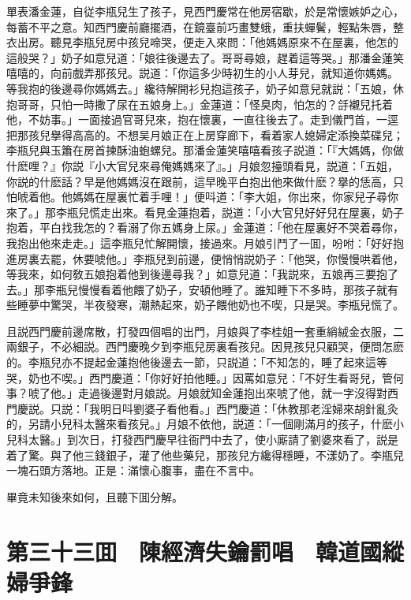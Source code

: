單表潘金蓮，自従李瓶兒生了孩子，見西門慶常在他房宿歇，於是常懷嫉妒之心，每蓄不平之意。知西門慶前廳擺酒，在鏡臺前巧畫雙蛾，重扶蟬鬢，輕點朱唇，整衣出房。聽見李瓶兒房中孩兒啼哭，便走入來問：「他媽媽原來不在屋裏，他怎的這般哭？」奶子如意兒道：「娘往後邊去了。哥哥尋娘，趕着這等哭。」那潘金蓮笑嘻嘻的，向前戲弄那孩兒。説道：「你這多少時初生的小人芽兒，就知道你媽媽。等我抱的後邊尋你媽媽去。」纔待解開衫兒抱這孩子，奶子如意兒就説：「五娘，休抱哥哥，只怕一時撒了尿在五娘身上。」金蓮道：「怪臭肉，怕怎的？㧱襯兒托着他，不妨事。」一面接過官哥兒來，抱在懷裏，一直往後去了。走到儀門首，一逕把那孩兒擧得高高的。不想吴月娘正在上房穿廊下，看着家人媳婦定添換菜碟兒；李瓶兒與玉簫在房首揀酥油蚫螺兒。那潘金蓮笑嘻嘻看孩子説道：「『大媽媽，你做什麽哩？』你説『小大官兒來尋俺媽媽來了』。」月娘忽擡頭看見，説道：「五姐，你説的什麽話？早是他媽媽沒在跟前，這早晚平白抱出他來做什麽？擧的恁高，只怕唬着他。他媽媽在屋裏忙着手哩！」便呌道：「李大姐，你出來，你家兒子尋你來了。」那李瓶兒慌走出來。看見金蓮抱着，説道：「小大官兒好好兒在屋裏，奶子抱着，平白找我怎的？看溺了你五媽身上尿。」金蓮道：「他在屋裏好不哭着尋你，我抱出他來走走。」這李瓶兒忙解開懷，接過來。月娘引鬥了一囬，吩咐：「好好抱進房裏去罷，休要唬他。」李瓶兒到前邊，便悄悄説奶子：「他哭，你慢慢哄着他，等我來，如何敎五娘抱着他到後邊尋我？」如意兒道：「我説來，五娘再三要抱了去。」那李瓶兒慢慢看着他餵了奶子，安頓他睡了。誰知睡下不多時，那孩子就有些睡夢中驚哭，半夜發寒，潮熱起來，奶子餵他奶也不喫，只是哭。李瓶兒慌了。

且説西門慶前邊席散，打發四個唱的出門，月娘與了李桂姐一套重綃絨金衣服，二兩銀子，不必細説。西門慶晚夕到李瓶兒房裏看孩兒。因見孩兒只顧哭，便問怎麽的。李瓶兒亦不提起金蓮抱他後邊去一節，只説道：「不知怎的，睡了起來這等哭，奶也不喫。」西門慶道：「你好好拍他睡。」因罵如意兒：「不好生看哥兒，管何事？唬了他。」走過後邊對月娘説。月娘就知金蓮抱出來唬了他，就一字沒得對西門慶説。只説：「我明日呌劉婆子看他看。」西門慶道：「休教那老淫婦來胡針亂灸的，另請小兒科太醫來看孩兒。」月娘不依他，説道：「一個剛滿月的孩子，什麽小兒科太醫。」到次日，打發西門慶早往衙門中去了，使小廝請了劉婆來看了，説是着了驚。與了他三錢銀子，灌了他些藥兒，那孩兒方纔得穩睡，不漾奶了。李瓶兒一塊石頭方落地。正是：滿懷心腹事，盡在不言中。

畢竟未知後來如何，且聽下囬分解。

\chapter*{第三十三囬　陳經濟失鑰罰唱　韓道國縱婦爭鋒}

